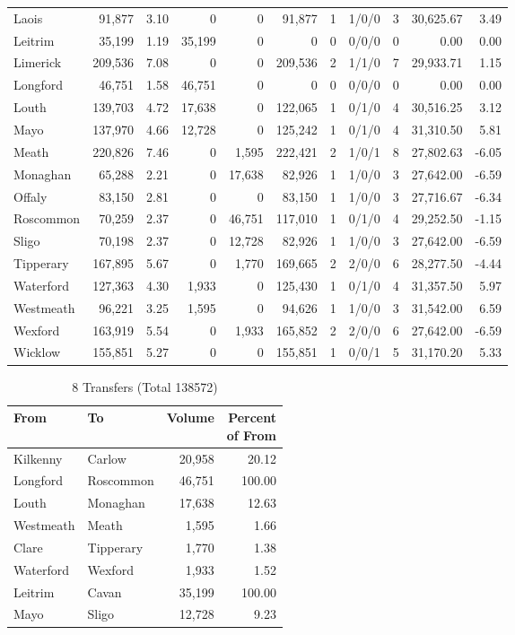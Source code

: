 \documentclass[a4paper]{article}
\begin{document}
\begin{longtable}{lrrrrrrlrrr}
Laois&91,877& 3.10&0&0&91,877&1&1/0/0&3&30,625.67& 3.49\\ 
Leitrim&35,199& 1.19&35,199&0&0&0&0/0/0&0& 0.00& 0.00\\ 
Limerick&209,536& 7.08&0&0&209,536&2&1/1/0&7&29,933.71& 1.15\\ 
Longford&46,751& 1.58&46,751&0&0&0&0/0/0&0& 0.00& 0.00\\ 
Louth&139,703& 4.72&17,638&0&122,065&1&0/1/0&4&30,516.25& 3.12\\ 
Mayo&137,970& 4.66&12,728&0&125,242&1&0/1/0&4&31,310.50& 5.81\\ 
Meath&220,826& 7.46&0&1,595&222,421&2&1/0/1&8&27,802.63&-6.05\\ 
Monaghan&65,288& 2.21&0&17,638&82,926&1&1/0/0&3&27,642.00&-6.59\\ 
Offaly&83,150& 2.81&0&0&83,150&1&1/0/0&3&27,716.67&-6.34\\ 
Roscommon&70,259& 2.37&0&46,751&117,010&1&0/1/0&4&29,252.50&-1.15\\ 
Sligo&70,198& 2.37&0&12,728&82,926&1&1/0/0&3&27,642.00&-6.59\\ 
Tipperary&167,895& 5.67&0&1,770&169,665&2&2/0/0&6&28,277.50&-4.44\\ 
Waterford&127,363& 4.30&1,933&0&125,430&1&0/1/0&4&31,357.50& 5.97\\ 
Westmeath&96,221& 3.25&1,595&0&94,626&1&1/0/0&3&31,542.00& 6.59\\ 
Wexford&163,919& 5.54&0&1,933&165,852&2&2/0/0&6&27,642.00&-6.59\\ 
Wicklow&155,851& 5.27&0&0&155,851&1&0/0/1&5&31,170.20& 5.33\\ 
\end{longtable}

\begin{table}[htbp]
\caption{8 Transfers (Total 138572)}
\centering
\begin{tabular}{llrr} \toprule
From &To &Volume &\shortstack{Percent\\of From} \\ \midrule
Kilkenny&Carlow&20,958&20.12\\ 
Longford&Roscommon&46,751&100.00\\ 
Louth&Monaghan&17,638&12.63\\ 
Westmeath&Meath&1,595& 1.66\\ 
Clare&Tipperary&1,770& 1.38\\ 
Waterford&Wexford&1,933& 1.52\\ 
Leitrim&Cavan&35,199&100.00\\ 
Mayo&Sligo&12,728& 9.23\\ 
\bottomrule
\end{tabular}
\end{table}
\end{document}
